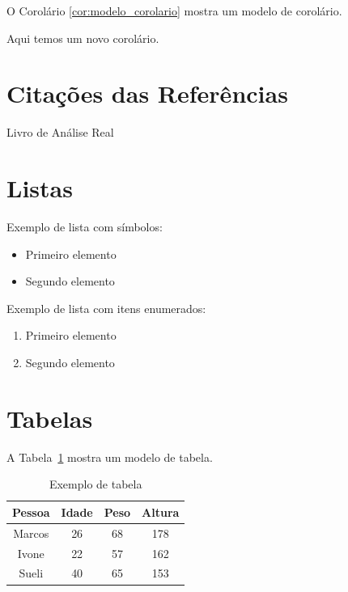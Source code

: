 \documentclass[12pt,a4paper,oneside]{abntex2}
\begin{document}
O Corolário \ref{cor:modelo_corolario} mostra um modelo de corolário.

\begin{corolario}
Aqui temos um novo corolário.
\label{cor:modelo_corolario}
\end{corolario}


\section{Citações das Referências}

Livro de Análise Real~\cite{lima2004analise}


\section{Listas}

Exemplo de lista com símbolos:

\begin{itemize}
    \item Primeiro elemento
    \item Segundo elemento
\end{itemize}

Exemplo de lista com itens enumerados:

\begin{enumerate}
    \item Primeiro elemento
    \item Segundo elemento
\end{enumerate}


\section{Tabelas}

A Tabela~\ref{tab:modelo_tabela} mostra um modelo de tabela.

\begin{table}[htb]
    \caption{Exemplo de tabela}
    \label{tab:modelo_tabela}
    \centering
    \begin{tabular}{c|c|c|c}
	    \hline
	    \textbf{Pessoa} & \textbf{Idade} & \textbf{Peso} & \textbf{Altura} \\ \hline
	    Marcos & 26    & 68   & 178    \\ \hline
	    Ivone  & 22    & 57   & 162    \\ \hline
	    Sueli  & 40    & 65   & 153    \\ \hline
    \end{tabular}
\end{table}
\end{document}
